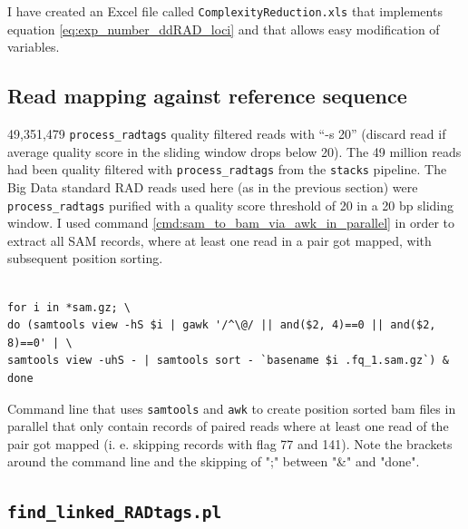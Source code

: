 \documentclass[a4paper,12pt,times,print,index,custombib,custommargin]{PhDThesisPSnPDF}\usepackage[]{graphicx}\usepackage[]{color}
\begin{document}
I have created an Excel file called \texttt{ComplexityReduction.xls} that implements equation \ref{eq:exp_number_ddRAD_loci} and that allows easy modification of variables.


\FloatBarrier
\subsection{Read mapping against reference sequence}\label{ch:read_mapping}

49,351,479 \texttt{process\_radtags} quality filtered reads with ``-s 20'' (discard read if average quality score in the sliding window drops below 20). The 49 million reads had been quality filtered with \texttt{process\_radtags} from the \texttt{stacks} pipeline. The Big Data standard RAD reads used here (as in the previous section) were \texttt{process\_radtags} purified with a quality score threshold of 20 in a 20 bp sliding window. I used command \ref{cmd:sam_to_bam_via_awk_in_parallel} in order to extract all SAM records, where at least one read in a pair got mapped, with subsequent position sorting.

\begin{cmd}
\captionsetup{type=cmd} %
\begin{Verbatim}[fontsize=\scriptsize, formatcom=\color{darkgray}]

for i in *sam.gz; \
do (samtools view -hS $i | gawk '/^\@/ || and($2, 4)==0 || and($2, 8)==0' | \
samtools view -uhS - | samtools sort - `basename $i .fq_1.sam.gz`) & done
\end{Verbatim}
\caption{Command line that uses \texttt{samtools} and \texttt{awk} to create position sorted bam files in parallel that only contain records of paired reads where at least one read of the pair got mapped (i. e. skipping records with flag 77 and 141). \scriptsize{Note the brackets around the command line and the skipping of ";" between "\&" and "done"}. }
\label{cmd:sam_to_bam_via_awk_in_parallel}
\end{cmd}

\FloatBarrier
\subsection{\texttt{find\_linked\_RADtags.pl}}\label{ch:find_linked_RADtags}
\end{document}
